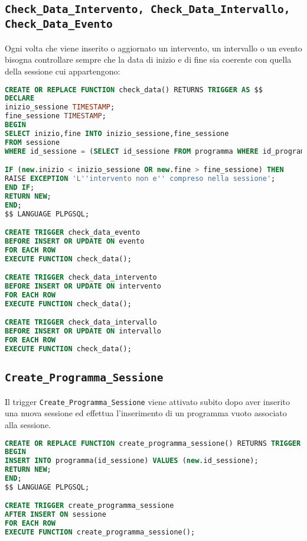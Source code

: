 \subsection{\texttt{Check\_Data\_Intervento, Check\_Data\_Intervallo, Check\_Data\_Evento}}\label{trigger:check_data}
Ogni volta che viene inserito o aggiornato un intervento, un intervallo o un evento bisogna controllare sempre che la data di inizio e di fine sia coerente con quella della sessione cui appartengono:
\begin{lstlisting}[caption={check\_data\_intervento},language=SQL,style=mystyle]
CREATE OR REPLACE FUNCTION check_data() RETURNS TRIGGER AS $$
DECLARE
inizio_sessione TIMESTAMP;
fine_sessione TIMESTAMP;
BEGIN
SELECT inizio,fine INTO inizio_sessione,fine_sessione
FROM sessione
WHERE id_sessione = (SELECT id_sessione FROM programma WHERE id_programma = new.id_programma);

IF (new.inizio < inizio_sessione OR new.fine > fine_sessione) THEN
RAISE EXCEPTION 'L''intervento non e'' compreso nella sessione';
END IF;
RETURN NEW;
END;
$$ LANGUAGE PLPGSQL;

CREATE TRIGGER check_data_evento
BEFORE INSERT OR UPDATE ON evento
FOR EACH ROW
EXECUTE FUNCTION check_data();

CREATE TRIGGER check_data_intervento
BEFORE INSERT OR UPDATE ON intervento
FOR EACH ROW
EXECUTE FUNCTION check_data();

CREATE TRIGGER check_data_intervallo
BEFORE INSERT OR UPDATE ON intervallo
FOR EACH ROW
EXECUTE FUNCTION check_data();
\end{lstlisting}
\subsection{\texttt{Create\_Programma\_Sessione}}
Il trigger \texttt{Create\_Programma\_Sessione} viene attivato subito dopo aver inserito una nuova sessione ed effettua l'inserimento di un programma vuoto associato alla sessione.
\begin{lstlisting}[language=SQL, caption={\texttt{create\_programma\_sessione}},style=mystyle]
CREATE OR REPLACE FUNCTION create_programma_sessione() RETURNS TRIGGER AS $$
BEGIN
INSERT INTO programma(id_sessione) VALUES (new.id_sessione);
RETURN NEW;
END;
$$ LANGUAGE PLPGSQL;

CREATE TRIGGER create_programma_sessione
AFTER INSERT ON sessione
FOR EACH ROW
EXECUTE FUNCTION create_programma_sessione();
\end{lstlisting}

